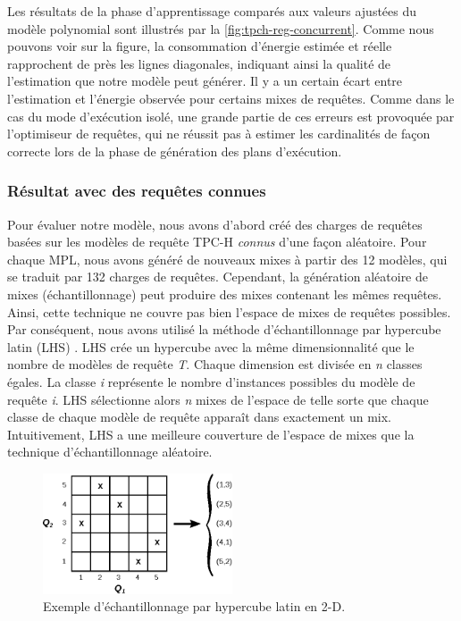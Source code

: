 Les résultats de la phase d'apprentissage comparés aux valeurs ajustées du modèle polynomial sont illustrés par la \ref{fig:tpch-reg-concurrent}. Comme nous pouvons voir sur la figure, la consommation d'énergie estimée et réelle rapprochent de près les lignes diagonales, indiquant ainsi la qualité de l'estimation que notre modèle peut générer. Il y a un certain écart entre l'estimation et l'énergie observée pour certains mixes de requêtes. Comme dans le cas du mode d'exécution isolé, une grande partie de ces erreurs est provoquée par l'optimiseur de requêtes, qui ne réussit pas à estimer les cardinalités de façon correcte lors de la phase de génération des plans d'exécution.

\subsubsection{Résultat avec des requêtes connues}
Pour évaluer notre modèle,  nous avons d'abord créé des charges de requêtes basées sur les modèles de requête TPC-H \textit{connus} d'une façon aléatoire. Pour chaque MPL, nous avons généré de nouveaux mixes à partir des 12 modèles, qui se traduit par 132 charges de requêtes.
Cependant, la génération aléatoire de mixes (échantillonnage) peut produire des mixes contenant les mêmes requêtes. Ainsi, cette technique ne couvre pas bien l'espace de mixes de requêtes possibles. Par conséquent, nous avons utilisé la méthode d'échantillonnage par hypercube latin (\gls{LHS}) \cite{Ahmad11}.
LHS crée un hypercube avec la même dimensionnalité que le nombre de modèles de requête \textit{T}. Chaque dimension est divisée en \textit{n} classes égales. La classe \textit{i} représente le nombre d'instances possibles du modèle de requête \textit{i}. LHS sélectionne alors \textit{n} mixes de l'espace de telle sorte que chaque classe de chaque modèle de requête apparaît dans exactement un mix. Intuitivement, LHS a une meilleure couverture de l'espace de mixes que la technique d'échantillonnage aléatoire.

\begin{figure}%
  \centering
  \includegraphics[width=0.5\textwidth]{chapitre4/chap4Fig/lhs.eps}
  \caption{Exemple d'échantillonnage par hypercube latin en 2-D.}\label{fig:lhs}
\end{figure}

